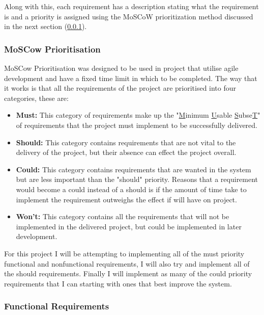 \documentclass[12pt]{article}  %
\begin{document}
Along with this, each requirement has a description stating what the requirement is and a  priority is assigned using the MoSCoW prioritization method discussed in the next section (\ref{sec:moscow}).


\subsubsection{MoSCow Prioritisation}
\label{sec:moscow}

MoSCow Prioritisation \cite{noauthor_moscow_2015} was designed to be used in project that utilise agile development and have a fixed time limit in which to be completed. The way that it works is that all the requirements of the project are prioritised into four categories, these are:

\begin{itemize}

\item \textbf{Must:} This category of requirements make up the "\underline{M}inimum \underline{U}sable \underline{S}ubse\underline{T}" of requirements that the project must implement to be successfully delivered.

\item \textbf{Should:} This category contains requirements that are not vital to the delivery of the project, but their absence can effect the project overall. 

\item \textbf{Could:} This category contains requirements that are wanted in the system but are less important than the "should" priority. Reasons that a requirement would become a could instead of a should is if the amount of time take to implement the requirement outweighs the effect if will have on project.   

\item \textbf{Won't:} This category contains all the requirements that will not be implemented in the delivered project, but could be implemented in later development.
\end{itemize}

\noindent For this project I will be attempting to implementing all of the must priority functional and nonfunctional requirements, I will also try and implement all of the should requirements. Finally I will implement as many of the could priority requirements that I can starting with ones that best improve the system.


\def\arraystretch{1.5}
\subsubsection{Functional Requirements} \label{sec:func}
\end{document}
